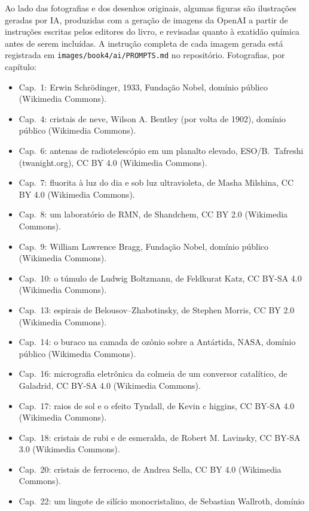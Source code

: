 \bigskip
Ao lado das fotografias e dos desenhos originais, algumas figuras são
ilustrações geradas por IA, produzidas com a geração de imagens da OpenAI a
partir de instruções escritas pelos editores do livro, e revisadas quanto à
exatidão química antes de serem incluídas. A instrução completa de cada
imagem gerada está registrada em \texttt{images/book4/ai/PROMPTS.md} no
repositório.
\bigskip
\noindent Fotografias, por capítulo:
\begin{itemize}\small
  \item Cap.~1: Erwin Schr\"odinger, 1933, Fundação Nobel, domínio público
        (Wikimedia Commons).
  \item Cap.~4: cristais de neve, Wilson A. Bentley (por volta de 1902), domínio público
        (Wikimedia Commons).
  \item Cap.~6: antenas de radiotelescópio em um planalto elevado, ESO/B.~Tafreshi
        (twanight.org), CC BY 4.0 (Wikimedia Commons).
  \item Cap.~7: fluorita à luz do dia e sob luz ultravioleta, de Masha
        Milshina, CC BY 4.0 (Wikimedia Commons).
  \item Cap.~8: um laboratório de RMN, de Shandchem, CC BY 2.0 (Wikimedia
        Commons).
  \item Cap.~9: William Lawrence Bragg, Fundação Nobel, domínio público
        (Wikimedia Commons).
  \item Cap.~10: o túmulo de Ludwig Boltzmann, de Feldkurat Katz,
        CC BY-SA 4.0 (Wikimedia Commons).
  \item Cap.~13: espirais de Belousov--Zhabotinsky, de Stephen Morris, CC BY 2.0
        (Wikimedia Commons).
  \item Cap.~14: o buraco na camada de ozônio sobre a Antártida, NASA, domínio público (Wikimedia
        Commons).
  \item Cap.~16: micrografia eletrônica da colmeia de um conversor catalítico, de
        Galadrid, CC BY-SA 4.0 (Wikimedia Commons).
  \item Cap.~17: raios de sol e o efeito Tyndall, de Kevin c higgins, CC BY-SA 4.0
        (Wikimedia Commons).
  \item Cap.~18: cristais de rubi e de esmeralda, de Robert M. Lavinsky, CC BY-SA 3.0
        (Wikimedia Commons).
  \item Cap.~20: cristais de ferroceno, de Andrea Sella, CC BY 4.0 (Wikimedia
        Commons).
  \item Cap.~22: um lingote de silício monocristalino, de Sebastian Wallroth, domínio

\end{itemize}

